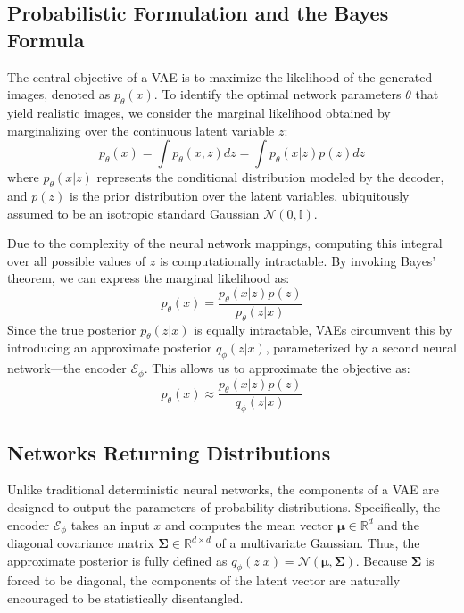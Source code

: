 \subsection{Probabilistic Formulation and the Bayes Formula}
The central objective of a VAE is to maximize the likelihood of the generated images, denoted as $p_\theta(x)$. To identify the optimal network parameters $\theta$ that yield realistic images, we consider the marginal likelihood obtained by marginalizing over the continuous latent variable $z$:
\begin{equation}
p_\theta(x) = \int p_\theta(x, z) dz = \int p_\theta(x|z)p(z) dz
\end{equation}
where $p_\theta(x|z)$ represents the conditional distribution modeled by the decoder, and $p(z)$ is the prior distribution over the latent variables, ubiquitously assumed to be an isotropic standard Gaussian $\mathcal{N}(0, \mathbb{I})$. 

Due to the complexity of the neural network mappings, computing this integral over all possible values of $z$ is computationally intractable. By invoking Bayes' theorem, we can express the marginal likelihood as:
\begin{equation}
p_\theta(x) = \frac{p_\theta(x|z)p(z)}{p_\theta(z|x)}
\end{equation}
Since the true posterior $p_\theta(z|x)$ is equally intractable, VAEs circumvent this by introducing an approximate posterior $q_\phi(z|x)$, parameterized by a second neural network—the encoder $\mathcal{E}_\phi$. This allows us to approximate the objective as:
\begin{equation}
p_\theta(x) \approx \frac{p_\theta(x|z)p(z)}{q_\phi(z|x)}
\end{equation}

\subsection{Networks Returning Distributions}
Unlike traditional deterministic neural networks, the components of a VAE are designed to output the parameters of probability distributions. Specifically, the encoder $\mathcal{E}_\phi$ takes an input $x$ and computes the mean vector $\boldsymbol{\mu} \in \mathbb{R}^d$ and the diagonal covariance matrix $\boldsymbol{\Sigma} \in \mathbb{R}^{d \times d}$ of a multivariate Gaussian. Thus, the approximate posterior is fully defined as $q_\phi(z|x) = \mathcal{N}(\boldsymbol{\mu}, \boldsymbol{\Sigma})$. Because $\boldsymbol{\Sigma}$ is forced to be diagonal, the components of the latent vector are naturally encouraged to be statistically disentangled.

